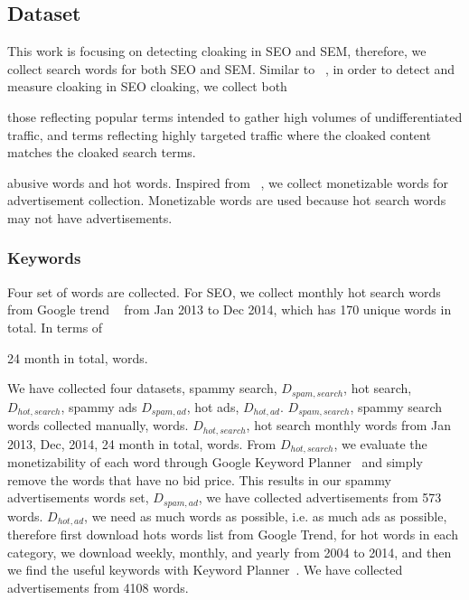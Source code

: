 \subsection{Dataset}
\label{ss:dataset}
This work is focusing on detecting cloaking in SEO and SEM, therefore, we
collect search words for both SEO and SEM. Similar to ~\cite{wang2011cloak},
in order to detect and measure cloaking in SEO cloaking, we collect both


those reflecting popular terms intended to gather high volumes of
undifferentiated traffic, and terms reflecting highly targeted traffic where the
cloaked content matches the cloaked search terms.





abusive words and hot words. Inspired from ~\cite{chellapilla2006improving}, we
collect monetizable words for advertisement collection. Monetizable words are
used because hot search words may not have advertisements.

\subsubsection{Keywords}
Four set of words are collected. For SEO, we collect monthly hot search words
from Google trend ~\cite{google-trend} from Jan 2013 to Dec 2014, which has 170
unique words in total. In terms of 

24 month
in total,   words.


We have collected four datasets, spammy search, $D_{spam, search}$, hot search,
$D_{hot, search}$, spammy ads $D_{spam, ad}$, hot ads, $D_{hot, ad}$. 
$D_{spam, search}$, spammy search words collected manually,  words.
$D_{hot, search}$, hot search monthly words from Jan 2013, Dec, 2014, 24 month
in total,   words.
From $D_{hot, search}$, we evaluate the monetizability of each word through
Google Keyword Planner~\cite{keyword-planner} and simply
remove the words that have no bid price. This results in our spammy
advertisements words set, $D_{spam, ad}$, we have collected advertisements from 573 words.
$D_{hot, ad}$, we need as much words as possible, i.e. as much ads as possible,
therefore first download hots words list from Google Trend, for hot words in
each category, we download weekly, monthly, and yearly from 2004 to 2014, and
then we find the useful keywords with Keyword Planner~\cite{keyword-planner}.
We have collected advertisements from 4108 words.



